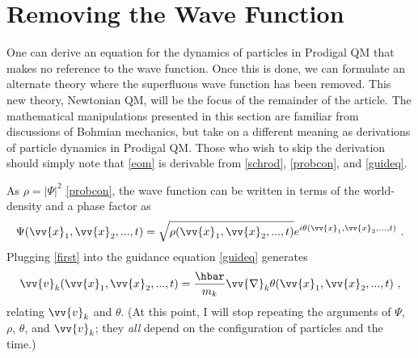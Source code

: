 \documentclass[12pt,secnumarabic,balancelastpage,amsmath,amssymb,nofootinbib]{article}
\begin{document}
\section{Removing the Wave Function}\label{removing}

One can derive an equation for the dynamics of particles in Prodigal QM that makes no reference to the wave function.  Once this is done, we can formulate an alternate theory where the superfluous wave function has been removed.  This new theory, Newtonian QM, will be the focus of the remainder of the article.  The mathematical manipulations presented in this section are familiar from discussions of Bohmian mechanics, but take on a different meaning as derivations of particle dynamics in Prodigal QM.  Those who wish to skip the derivation should simply note that \eqref{eom} is derivable from \eqref{schrod}, \eqref{probcon}, and \eqref{guideq}.

As $\rho=|\Psi|^2$ \eqref{probcon}, the wave function can be written in terms of the world-density and a phase factor as
\begin{equation}
\Psi(\vv{x}_1,\vv{x}_2,...,t)=\sqrt{\rho(\vv{x}_1,\vv{x}_2,...,t)}e^{i\theta(\vv{x}_1,\vv{x}_2,...,t)}\ .
\label{first}
\end{equation}
Plugging \eqref{first} into the guidance equation \eqref{guideq} generates
\begin{equation}
\vv{v}_k(\vv{x}_1,\vv{x}_2,...,t)=\frac{\hbar}{m_k}\vv{\nabla}_k\theta(\vv{x}_1,\vv{x}_2,...,t)\ ,
\label{guideq2}
\end{equation}
relating $\vv{v}_k$ and $\theta$.  (At this point, I will stop repeating the arguments of $\Psi$, $\rho$, $\theta$, and $\vv{v}_k$; they \emph{all} depend on the configuration of particles and the time.)
\end{document}
